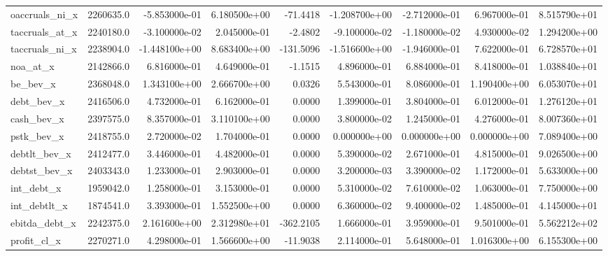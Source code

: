 \documentclass[12pt]{article}
\begin{document}
\begin{landscape}
\begin{longtable}{|l|r|r|r|r|r|r|r|r|}
oaccruals\_ni\_x          &  2260635.0 & -5.853000e-01 &  6.180500e+00 &    -71.4418 & -1.208700e+00 & -2.712000e-01 &  6.967000e-01 &  8.515790e+01 \\
taccruals\_at\_x          &  2240180.0 & -3.100000e-02 &  2.045000e-01 &     -2.4802 & -9.100000e-02 & -1.180000e-02 &  4.930000e-02 &  1.294200e+00 \\
taccruals\_ni\_x          &  2238904.0 & -1.448100e+00 &  8.683400e+00 &   -131.5096 & -1.516600e+00 & -1.946000e-01 &  7.622000e-01 &  6.728570e+01 \\
noa\_at\_x                &  2142866.0 &  6.816000e-01 &  4.649000e-01 &     -1.1515 &  4.896000e-01 &  6.884000e-01 &  8.418000e-01 &  1.038840e+01 \\
be\_bev\_x                &  2368048.0 &  1.343100e+00 &  2.666700e+00 &      0.0326 &  5.543000e-01 &  8.086000e-01 &  1.190400e+00 &  6.053070e+01 \\
debt\_bev\_x              &  2416506.0 &  4.732000e-01 &  6.162000e-01 &      0.0000 &  1.399000e-01 &  3.804000e-01 &  6.012000e-01 &  1.276120e+01 \\
cash\_bev\_x              &  2397575.0 &  8.357000e-01 &  3.110100e+00 &      0.0000 &  3.800000e-02 &  1.245000e-01 &  4.276000e-01 &  8.007360e+01 \\
pstk\_bev\_x              &  2418755.0 &  2.720000e-02 &  1.704000e-01 &      0.0000 &  0.000000e+00 &  0.000000e+00 &  0.000000e+00 &  7.089400e+00 \\
debtlt\_bev\_x            &  2412477.0 &  3.446000e-01 &  4.482000e-01 &      0.0000 &  5.390000e-02 &  2.671000e-01 &  4.815000e-01 &  9.026500e+00 \\
debtst\_bev\_x            &  2403343.0 &  1.233000e-01 &  2.903000e-01 &      0.0000 &  3.200000e-03 &  3.390000e-02 &  1.172000e-01 &  5.633000e+00 \\
int\_debt\_x              &  1959042.0 &  1.258000e-01 &  3.153000e-01 &      0.0000 &  5.310000e-02 &  7.610000e-02 &  1.063000e-01 &  7.750000e+00 \\
int\_debtlt\_x            &  1874541.0 &  3.393000e-01 &  1.552500e+00 &      0.0000 &  6.360000e-02 &  9.400000e-02 &  1.485000e-01 &  4.145000e+01 \\
ebitda\_debt\_x           &  2242375.0 &  2.161600e+00 &  2.312980e+01 &   -362.2105 &  1.666000e-01 &  3.959000e-01 &  9.501000e-01 &  5.562212e+02 \\
profit\_cl\_x             &  2270271.0 &  4.298000e-01 &  1.566600e+00 &    -11.9038 &  2.114000e-01 &  5.648000e-01 &  1.016300e+00 &  6.155300e+00 \\

\end{longtable}
\end{landscape}
\end{document}
